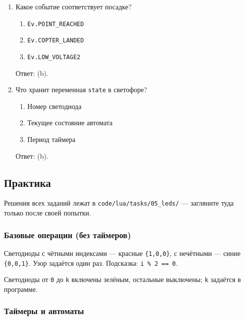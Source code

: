 \begin{enumerate}
  \begin{enumerate}[label=(\alph*)] \item \verb|onEvent(e)| \item \verb|callback(event)| \item \verb|handler(ev)| \end{enumerate}
  Ответ: (b).
\item Какое событие соответствует посадке?
  \begin{enumerate}[label=(\alph*)] \item \verb|Ev.POINT_REACHED| \item \verb|Ev.COPTER_LANDED| \item \verb|Ev.LOW_VOLTAGE2| \end{enumerate}
  Ответ: (b).
\item Что хранит переменная \verb|state| в светофоре?
  \begin{enumerate}[label=(\alph*)] \item Номер светодиода \item Текущее состояние автомата \item Период таймера \end{enumerate}
  Ответ: (b).
\end{enumerate}

\subsection{Практика}

Решения всех заданий лежат в \texttt{code/lua/tasks/05\_leds/} --- загляните туда только после своей попытки.

\subsubsection*{Базовые операции (без таймеров)}

\begin{taskbox}
Светодиоды с чётными индексами --- красные \verb|{1,0,0}|, с нечётными --- синие \verb|{0,0,1}|. Узор задаётся один раз. Подсказка: \verb|i % 2 == 0|.
\end{taskbox}

\begin{taskbox}
Светодиоды от \verb|0| до \verb|k| включены зелёным, остальные выключены; \verb|k| задаётся в программе.
\end{taskbox}

\subsubsection*{Таймеры и автоматы}

